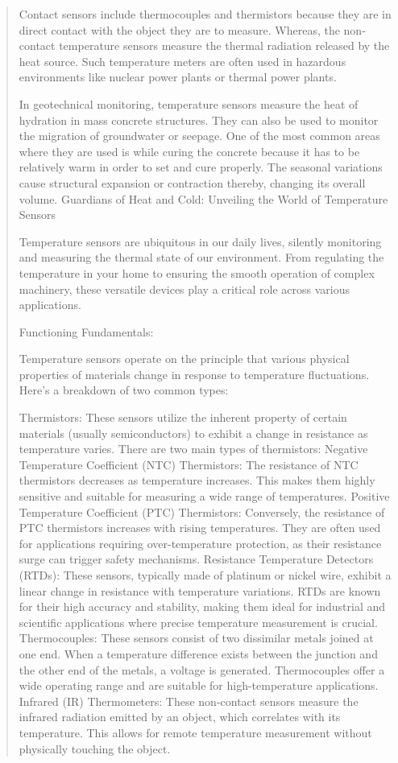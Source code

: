 \documentclass[12pt]{report}
\begin{document}
\begin{quote}
					Contact sensors include thermocouples and thermistors because they are in direct contact with the object they are to measure. Whereas, the non-contact temperature sensors measure the thermal radiation released by the heat source. Such temperature meters are often used in hazardous environments like nuclear power plants or thermal power plants.
					
					In geotechnical monitoring, temperature sensors measure the heat of hydration in mass concrete structures. They can also be used to monitor the migration of groundwater or seepage. One of the most common areas where they are used is while curing the concrete because it has to be relatively warm in order to set and cure properly. The seasonal variations cause structural expansion or contraction thereby, changing its overall volume.
					Guardians of Heat and Cold: Unveiling the World of Temperature Sensors
					
					Temperature sensors are ubiquitous in our daily lives, silently monitoring and measuring the thermal state of our environment. From regulating the temperature in your home to ensuring the smooth operation of complex machinery, these versatile devices play a critical role across various applications.
					
					Functioning Fundamentals:
					
					Temperature sensors operate on the principle that various physical properties of materials change in response to temperature fluctuations. Here's a breakdown of two common types:
					
					Thermistors: These sensors utilize the inherent property of certain materials (usually semiconductors) to exhibit a change in resistance as temperature varies. There are two main types of thermistors:
					Negative Temperature Coefficient (NTC) Thermistors: The resistance of NTC thermistors decreases as temperature increases. This makes them highly sensitive and suitable for measuring a wide range of temperatures.
					Positive Temperature Coefficient (PTC) Thermistors: Conversely, the resistance of PTC thermistors increases with rising temperatures. They are often used for applications requiring over-temperature protection, as their resistance surge can trigger safety mechanisms.
					Resistance Temperature Detectors (RTDs): These sensors, typically made of platinum or nickel wire, exhibit a linear change in resistance with temperature variations. RTDs are known for their high accuracy and stability, making them ideal for industrial and scientific applications where precise temperature measurement is crucial.
					Thermocouples: These sensors consist of two dissimilar metals joined at one end. When a temperature difference exists between the junction and the other end of the metals, a voltage is generated. Thermocouples offer a wide operating range and are suitable for high-temperature applications.
					Infrared (IR) Thermometers: These non-contact sensors measure the infrared radiation emitted by an object, which correlates with its temperature. This allows for remote temperature measurement without physically touching the object.
					

\end{quote}
\end{document}
